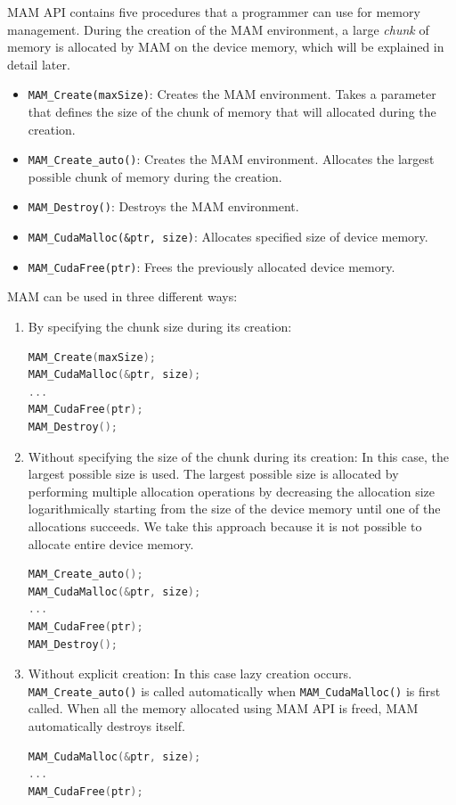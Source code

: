 \documentclass[conference]{IEEEtran}
\def\code#1{\texttt{#1}}
\begin{document}
MAM API contains five procedures that a programmer can use for memory management. 
During the creation of the MAM environment, a large \emph{chunk} of memory is allocated by MAM on the device memory, which will be explained in detail later. 

\begin{itemize} 
\item \code{MAM\_Create(maxSize)}: Creates the MAM environment. Takes a parameter that defines the size of the chunk of memory that will allocated during the creation.

\item \code{MAM\_Create\_auto()}: Creates the MAM environment. Allocates the largest possible chunk of memory during the creation.

\item \code{MAM\_Destroy()}: Destroys the MAM environment.

\item \code{MAM\_CudaMalloc(\&ptr, size)}: Allocates specified size of device memory.

\item \code{MAM\_CudaFree(ptr)}: Frees the previously allocated device memory.
\end{itemize} 

MAM can be used in three different ways:

\begin{enumerate} 
\item {By specifying the chunk size during its creation:}
\begin{lstlisting}[language=C]
MAM_Create(maxSize);
MAM_CudaMalloc(&ptr, size);
...
MAM_CudaFree(ptr);
MAM_Destroy();
\end{lstlisting}

\item {Without specifying the size of the chunk during its creation:}
In this case, the largest possible size is used. The largest possible size is allocated by performing multiple allocation operations by decreasing the allocation size logarithmically starting from the size of the device memory until one of the allocations succeeds. We 
take this approach because it is not possible to allocate entire device memory. 

\begin{lstlisting}[language=C]
MAM_Create_auto();
MAM_CudaMalloc(&ptr, size);
...
MAM_CudaFree(ptr);
MAM_Destroy();
\end{lstlisting}

\item{Without explicit creation:}
In this case lazy creation occurs. \code{MAM\_Create\_auto()} is called automatically when \code{MAM\_CudaMalloc()} is first called. When all the memory allocated using MAM API is  freed, MAM automatically destroys itself.

\begin{lstlisting}[language=C]
MAM_CudaMalloc(&ptr, size);
...
MAM_CudaFree(ptr);
\end{lstlisting}
\end{enumerate} 
\end{document}
